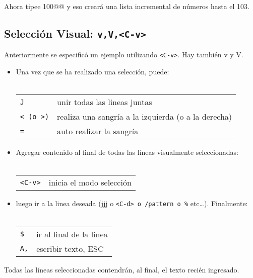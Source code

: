 Ahora tipee 100@@ y eso creará una lista incremental de números hasta el 103.



\subsection{Selección Visual: \texttt{v,V,<C-v>}}


Anteriormente se especificó un ejemplo utilizando \texttt{<C-v>}.
Hay también v y V. 


\begin{itemize}
	\item Una vez que se ha realizado una selección, puede: \\ \\
\begin{tabular}{ l l }
	\texttt{J} & unir todas las lineas juntas \\
	\texttt{< (o >)} & realiza una sangría a la izquierda (o a la derecha) \\
	\texttt{=} & auto realizar la sangría \\
\end{tabular}
\end{itemize}





\begin{itemize}
	\item Agregar contenido al final de todas las líneas visualmente seleccionadas: \\ \\
\begin{tabular}{ l l }
	\texttt{<C-v>} & inicia el modo selección \\
\end{tabular}
\end{itemize}
\begin{itemize}
    \item luego ir a la linea deseada (jjj o \texttt{<C-d> o /pattern o \%} etc…). Finalmente: \\ \\
\begin{tabular}{ l l }
	\texttt{\$} & ir al final de la linea \\
	\texttt{A,} & escribir texto, ESC \\
\end{tabular}
\end{itemize}

Todas las líneas seleccionadas contendrán, al final, el texto recién ingresado.



